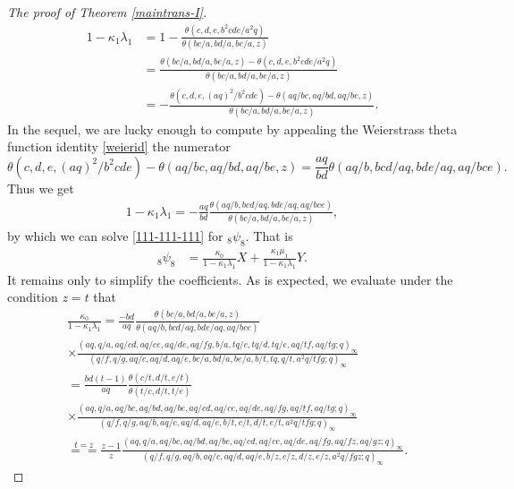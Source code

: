 \documentclass[xits,review,sort&compress]{elsarticle}
\numberwithin{equation}{section}
\begin{document}
\begin{proof}[The proof of Theorem \ref{maintrans-I}]
\begin{align*}
1-\kappa_1\lambda_1%
&=1-\frac{\theta(c,d,e,b^2cde/a^2q)}{\theta(bc/a,bd/a,be/a,z)}
\\&=\frac{\theta(bc/a,bd/a,be/a,z)-\theta(c,d,e,b^2cde/a^2q)}
{\theta(bc/a,bd/a,be/a,z)}
\\
&=-\frac{\theta(c,d,e,(aq)^2/b^2cde)-\theta(aq/bc,aq/bd,aq/be,z)}
{\theta(bc/a,bd/a,be/a,z)}.
\end{align*}
In the sequel, we are lucky enough to compute  by appealing  the Weierstrass theta function identity \eqref{weierid}  the numerator
$$
\theta(c,d,e,(aq)^2/b^2cde)-\theta(aq/bc,aq/bd,aq/be,z)=
\frac{aq}{bd}\theta\left(a q/b,b c d/a q,b d e/a q,a q/b c e\right).
$$
Thus we get
\begin{align*}
1-\kappa_1\lambda_1=-\frac{aq}{bd}\frac{\theta\left(a q/b,b c d/a q,b d e/a q,a q/b c e\right)}{\theta(bc/a,bd/a,be/a,z)},
\end{align*}
by which we can solve \eqref{111-111-111} for ${}_{8} \psi_{8}$. That is
\begin{align}
 {}_{8} \psi_{8}&=\frac{\kappa_0}{1-\kappa_1\lambda_1} X+\frac{\kappa_1\mu_1}{1-\kappa_1\lambda_1}Y.\label{IDEN-one}
\end{align}
It remains only to simplify the coefficients. As is expected, we evaluate   under the condition $z=t$ that
\begin{align*}
&\frac{\kappa_0}{1-\kappa_1\lambda_1}=\frac{-bd}{aq}\frac{\theta(bc/a,bd/a,be/a,z)}{\theta\left(a q/b,b c d/a q,b d e/a q,a q/b ce\right)}\\
&\times\frac{(aq, q / a, aq / c d, aq / c e, aq / d e, aq / f g, b / a, tq / c, tq / d, tq / e, aq / t f, aq / t g ; q)_{\infty}}{\left(q / f, q / g, aq / c, aq / d, aq / e, b c / a, b d / a, b e / a, b / t, tq, q / t, a^{2}q / t f g ; q\right)_{\infty}}\\
&=\frac{bd(t-1)}{aq}
\frac{\theta\left(c/t,d/t,e/t\right)}{\theta\left(t/c,
d/t,t/e\right)}\\
&\times\frac{(aq, q / a, aq/bc,aq/bd,aq/be, aq / c d, aq / c e, aq / d e, aq / f g, aq / t f, aq / t g ; q)_{\infty}}
{\left(q / f, q / g, aq/b,aq / c, aq / d, aq / e, b / t, c / t, d / t, e/ t, a^{2}q / t f g ; q\right)_{\infty}}\\
&\stackrel{t=z}{==}\frac{z-1}{z}\frac{(aq, q / a, aq/bc,aq/bd,aq/be, aq / c d, aq / c e, aq / d e, aq / f g, aq/ fz, aq/gz; q)_{\infty}}{\left(q / f, q / g, aq/b,aq / c, aq / d, aq / e, b /z, c /z, d /z, e/z, a^{2}q /fgz ; q\right)_{\infty}}.

\end{align*}
\end{proof}
\end{document}
